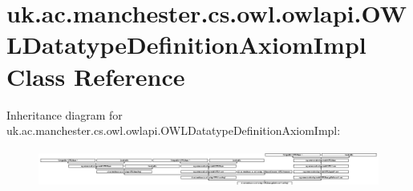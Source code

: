 \hypertarget{classuk_1_1ac_1_1manchester_1_1cs_1_1owl_1_1owlapi_1_1_o_w_l_datatype_definition_axiom_impl}{\section{uk.\-ac.\-manchester.\-cs.\-owl.\-owlapi.\-O\-W\-L\-Datatype\-Definition\-Axiom\-Impl Class Reference}
\label{classuk_1_1ac_1_1manchester_1_1cs_1_1owl_1_1owlapi_1_1_o_w_l_datatype_definition_axiom_impl}
}
Inheritance diagram for uk.\-ac.\-manchester.\-cs.\-owl.\-owlapi.\-O\-W\-L\-Datatype\-Definition\-Axiom\-Impl\-:\begin{figure}[H]
\begin{center}
\leavevmode
\includegraphics[height=1.275626cm]{classuk_1_1ac_1_1manchester_1_1cs_1_1owl_1_1owlapi_1_1_o_w_l_datatype_definition_axiom_impl}
\end{center}
\end{figure}
